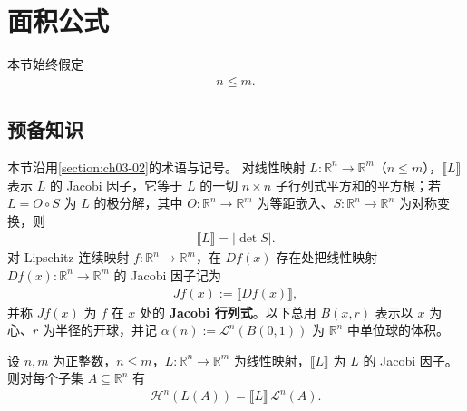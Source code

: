 \documentclass[../../main.tex]{subfiles}%
\begin{document}
\section{面积公式}\label{section:ch03-03}

本节始终假定
\begin{align*}
n\leqslant m.
\end{align*}

\subsection{预备知识}\label{subsection:ch03-03-1}

本节沿用\cref{section:ch03-02}的术语与记号。%
对线性映射 $L:\mathbb{R}^n\to\mathbb{R}^m$（$n\leqslant m$），$\llbracket L\rrbracket$ 表示 $L$ 的 Jacobi 因子，它等于 $L$ 的一切 $n\times n$ 子行列式平方和的平方根；若 $L=O\circ S$ 为 $L$ 的极分解，其中 $O:\mathbb{R}^n\to\mathbb{R}^m$ 为等距嵌入、$S:\mathbb{R}^n\to\mathbb{R}^n$ 为对称变换，则
\begin{align*}
\llbracket L\rrbracket=\lvert\det S\rvert .
\end{align*}
对 Lipschitz 连续映射 $f:\mathbb{R}^n\to\mathbb{R}^m$，在 $Df(x)$ 存在处把线性映射 $Df(x):\mathbb{R}^n\to\mathbb{R}^m$ 的 Jacobi 因子记为
\begin{align*}
Jf(x):=\llbracket Df(x)\rrbracket ,
\end{align*}
并称 $Jf(x)$ 为 $f$ 在 $x$ 处的 \textbf{Jacobi 行列式}。以下总用 $B(x,r)$ 表示以 $x$ 为心、$r$ 为半径的开球，并记 $\alpha(n):=\mathcal{L}^n(B(0,1))$ 为 $\mathbb{R}^n$ 中单位球的体积。

\begin{lemma}\label{lemma:ch03-3-1}
设 $n,m$ 为正整数，$n\leqslant m$，$L:\mathbb{R}^n\to\mathbb{R}^m$ 为线性映射，$\llbracket L\rrbracket$ 为 $L$ 的 Jacobi 因子。则对每个子集 $A\subseteq\mathbb{R}^n$ 有
\begin{align*}
\mathcal{H}^n(L(A))=\llbracket L\rrbracket\,\mathcal{L}^n(A).
\end{align*}
\end{lemma}
\end{document}
